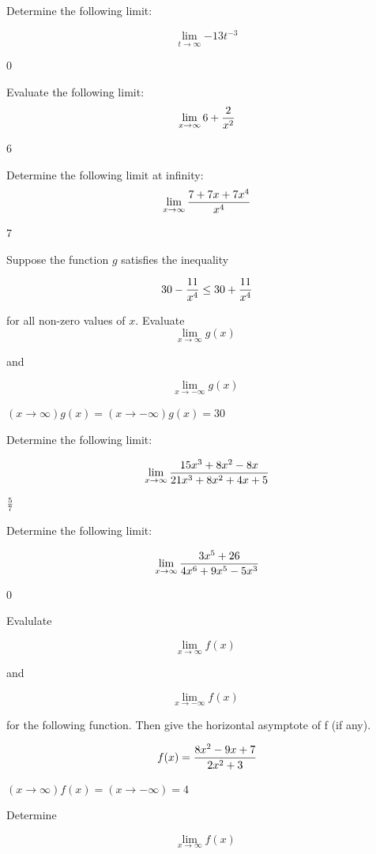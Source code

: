 \bigskip
{}
\bigskip
{}
Determine the following limit:

$$\
\lim_{t \to \infty}{
-13t^{-3}
}
$$

0

\bigskip

Evaluate the following limit:
$$\
\lim_{x \to \infty}{
6 + {2 \over x^2}
}
$$
\bigskip

6

Determine the following limit at infinity:
$$\
\lim_{x \to \infty}{
7 + 7x + 7x^4
\over
x^4
}
$$

 7

\bigskip
{}
Suppose the function $g$ satisfies the inequality

$$\
30 - {11 \over x^4} \le 30 + {11 \over x^4}
$$

for all non-zero values of $x$. Evaluate
$$\lim_{x \to \infty}{g(x)}$$

and

$$\lim_{x \to -\infty}{g(x)}$$
\bigskip

$({x \to \infty}){ g(x)} = ({x \to -\infty}) g(x) = 30$

Determine the following limit:

$$\
\lim_{x \to \infty}{
15x^3 + 8x^2 - 8x
\over
21x^3 + 8x^2 + 4x + 5
}
$$

\bigskip
{}
${5 \over 7}$

Determine the following limit:

$$\
\lim_{x \to \infty} {
3x^5 + 26
\over
4x^6 + 9x^5 - 5x^3
}
$$

0

\bigskip

Evalulate

$$\lim_{x \to \infty}{f(x)}$$

and

$$\lim_{x \to -\infty}{f(x)}$$

for the following function. Then give the
horizontal asymptote of f (if any).

$$\
f(x) = {
8x^2 - 9x + 7
\over
2x^2 + 3
}
$$

\bigskip
{}
$(x \to \infty) f(x) = (x \to -\infty) = 4$

Determine

$$\lim_{x \to \infty}{f(x)}$$

